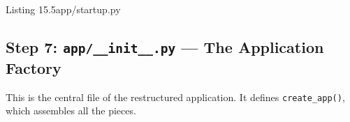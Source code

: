 \begin{codeboxcap}{\textcolor{accent}{Listing 15.5}\enspace app/startup.py}
\begin{Shaded}
\begin{Highlighting}[]
\NormalTok{) }\OperatorTok{{-}\textgreater{}} \NormalTok{:}
    \NormalTok{(}\SpecialStringTok{  }\SpecialCharTok{\{}\SpecialCharTok{\}}\NormalTok{, }\OperatorTok{=}
\NormalTok{)}
\end{Highlighting}
\end{Shaded}

\end{codeboxcap}

\subsection*{\texorpdfstring{Step 7: \texttt{app/\_\_init\_\_.py} --- The Application Factory}{Step 7: app/\_\_init\_\_.py --- The Application Factory}}\label{15-structuring-the-application:step-7-app--init--py--the-application-factory}

This is the central file of the restructured application. It defines \texttt{create\_app()}, which assembles all the pieces.

